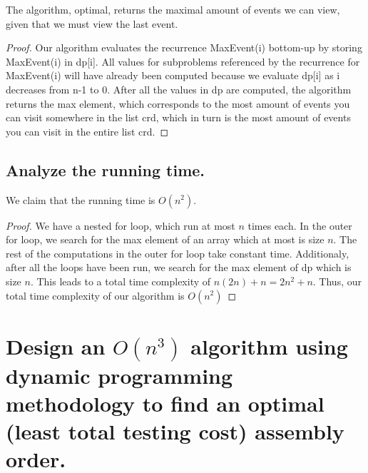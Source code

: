 \documentclass[11pt]{scrartcl}
\begin{document}
\begin{theorem*}
The algorithm, optimal, returns the maximal amount of events we can view, given that we must view the last event.

\begin{proof}
	Our algorithm evaluates the recurrence MaxEvent(i) bottom-up by storing MaxEvent(i) in dp[i].
	All values for subproblems referenced by the recurrence for MaxEvent(i) will have already been computed
	because we evaluate dp[i] as i decreases from n-1 to 0. 
	After all the values in dp are computed, the algorithm returns the max element, 
	which corresponds to the most amount of events you can visit somewhere in the list crd,
	which in turn is the most amount of events you can visit in the entire list crd.
\end{proof}

\end{theorem*}


\subsection{
	Analyze the running time.
}
We claim that the running time is $O(n^2)$.
\begin{proof}
	We have a nested for loop, which run at most $n$ times each.
	In the outer for loop, we search for the max element of an array
	which at most is size $n$. The rest of the computations in the outer for loop take constant time.
	Additionaly, after all the loops have been run, we search for the max element of dp which is
	size $n$. This leads to a total time complexity of $n(2n) + n = 2n^2 + n$.
	Thus, our total time complexity of our algorithm is $O(n^2)$
\end{proof}



\section{Design an $O(n^3)$ algorithm using dynamic programming methodology to find an optimal
(least total testing cost) assembly order.}
\end{document}
